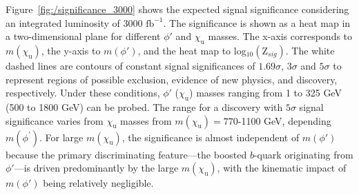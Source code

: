 Figure~\ref{fig:/significance_3000} shows the expected signal significance considering an integrated luminosity of 3000 $\mathrm{fb^{-1}}$. The significance is shown as a heat map in a two-dimensional plane for different $\phi'$ and $\chi_{\mathrm{u}}$ masses. The x-axis corresponds to $m(\chi_\mathrm{u})$, the y-axis to $m(\phi')$, and the heat map to log$_{10}(\mathrm{Z}_{sig})$. The white dashed lines are contours of constant signal significances of $1.69 \sigma$,  $3\sigma$ and  $5\sigma$ to represent regions of possible exclusion, evidence of new physics, and discovery, respectively. Under these conditions, $\phi'$ ($\chi_{\mathrm{u}}$) masses ranging from 1 to 325 \textrm{GeV} (500 to 1800 \textrm{GeV}) can be probed. The range for a discovery with $5\sigma$ signal significance varies from $\chi_{\mathrm{u}}$ masses from $m(\chi_{\mathrm{u}}) = 770$-1100 \textrm{GeV}, depending  $m(\phi^{'})$. For large $m(\chi_\mathrm{u})$, the significance is almost independent of $m(\phi')$ because the primary discriminating feature—the boosted $b$-quark originating from $\phi'$—is driven predominantly by the large $m(\chi_\mathrm{u})$, with the kinematic impact of $m(\phi')$ being relatively negligible.





